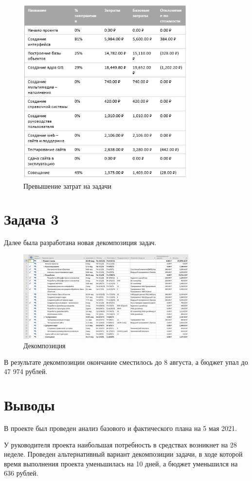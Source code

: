 \begin{figure}[H]
    \centering
    \includegraphics[width=0.8\textwidth]{img/content/task_02_2.png}
    \caption{Превышение затрат на задачи}
    \label{fig:task_02_2}
\end{figure}

\section{Задача 3}

Далее была разработана новая декомпозиция задач.

\begin{figure}[H]
    \centering
    \includegraphics[width=0.8\textwidth]{img/content/task_03.png}
    \caption{Декомпозиция}
    \label{fig:task_03}
\end{figure}

В результате декомпозиции окончание сместилось до 8 августа, а бюджет упал до 47 974 рублей.

\section{Выводы}


В проекте был проведен анализ базового и фактического плана на 5 мая 2021.

У руководителя проекта наибольшая потребность в средствах возникнет на 28 неделе. Проведен альтернативный вариант декомпозиции задачи, в ходе которой время выполнения проекта уменьшилась на 10 дней, а бюджет уменьшился на 636 рублей.
